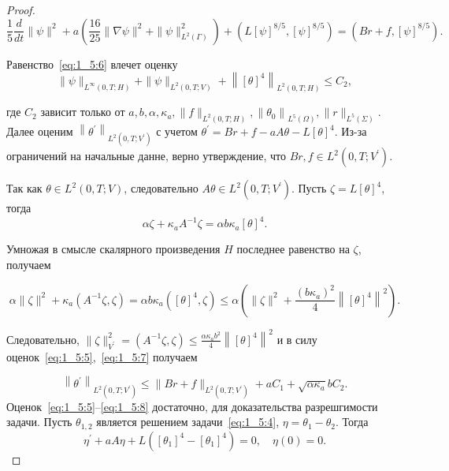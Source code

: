 \begin{proof}
    \begin{equation}
        \label{eq:1_5:6}
        \frac{1}{5} \frac{d}{d t}\|\psi\|^{2}
        +a\left(\frac{16}{25}\|\nabla \psi\|^{2}+\|\psi\|_{L^{2}(\Gamma)}^{2}\right)
        +\left(L[\psi]^{8 / 5},[\psi]^{8 / 5}\right)
        =\left(B r+f,[\psi]^{8 / 5}\right).
    \end{equation}


    Равенство~\eqref{eq:1_5:6} влечет оценку
    \begin{equation}
        \label{eq:1_5:7}
        \|\psi\|_{L^{\infty}(0, T ; H)}+\|\psi\|_{L^{2}(0, T ; V)}
        +\left\|[\theta]^{4}\right\|_{L^{2}(0, T ; H)} \leq C_{2},
    \end{equation}

    где $C_2$ зависит только от
    $a, b, \alpha, \kappa_{a},\|f\|_{L^{2}(0, T ; H)},
    \left\|\theta_{0}\right\|_{L^{5}(\Omega)},\|r\|_{L^{5}(\Sigma)}$.
    Далее оценим $\left\|\theta^{\prime}\right\|_{L^{2}\left(0, T ; V^{\prime}\right)}$
    с учетом $\theta^{\prime}=B r+f-a A \theta-L[\theta]^{4}$.
    Из-за ограничений на начальные данне, верно утверждение,
    что $B r, f \in L^{2}\left(0, T ; V^{\prime}\right)$.

    Так как $\theta \in L^{2}(0, T ; V)$,
    следовательно $A \theta \in L^{2}\left(0, T ; V^{\prime}\right)$.
    Пусть $\zeta=L[\theta]^{4}$, тогда
    \[
        \alpha \zeta+\kappa_{a} A^{-1} \zeta=\alpha b \kappa_{a}[\theta]^{4}.
    \]

    Умножая в смысле скалярного произведения $H$ последнее равенство на $\zeta$, получаем

    \[
        \alpha\|\zeta\|^{2}+\kappa_{a}\left(A^{-1} \zeta, \zeta\right)
        =\alpha b \kappa_{a}\left([\theta]^{4}, \zeta\right)
        \leq \alpha\left(\|\zeta\|^{2}
        +\frac{\left(b \kappa_{a}\right)^{2}}{4}\left\|[\theta]^{4}\right\|^{2}\right).
    \]

    Следовательно, $\|\zeta\|_{V^{\prime}}^{2}=\left(A^{-1} \zeta,
    \zeta\right) \leq \frac{\alpha \kappa_{a} b^{2}}{4}\left\|[\theta]^{4}\right\|^{2}$
    и в силу оценок~\eqref{eq:1_5:5},~\eqref{eq:1_5:7} получаем

    \begin{equation}
        \label{eq:1_5:8}
        \left\|\theta^{\prime}\right\|_{L^{2}\left(0, T ; V^{\prime}\right)}
        \leq\|B r+f\|_{L^{2}\left(0, T ; V^{\prime}\right)}
        +a C_{1}+\sqrt{\alpha \kappa_{a}} b C_{2}.
    \end{equation}
    Оценок~\eqref{eq:1_5:5}--\eqref{eq:1_5:8} достаточно, для доказательства разрешгимости задачи.
    Пусть $\theta_{1,2}$ является решением задачи~\eqref{eq:1_5:4}, $\eta=\theta_{1}-\theta_{2}$.
    Тогда
    \[
        \eta^{\prime}+a A \eta+L\left(\left[\theta_{1}\right]^{4}-
        \left[\theta_{1}\right]^{4}\right)=0, \quad \eta(0)=0.
    \]


\end{proof}
